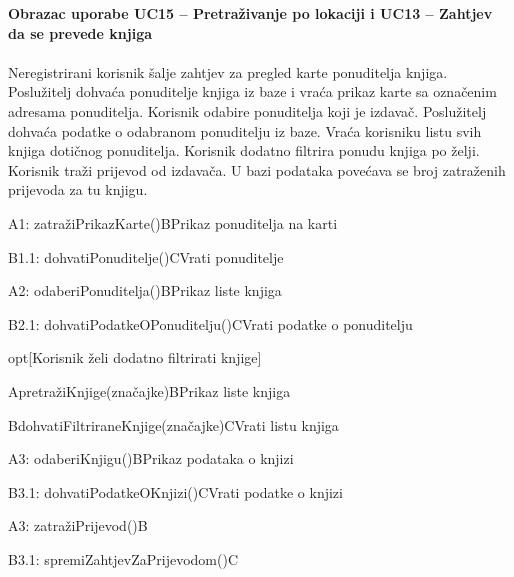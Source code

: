 				\textbf{Obrazac uporabe UC15 – Pretraživanje po lokaciji i UC13 – Zahtjev da se prevede knjiga}\\\\
				Neregistrirani korisnik šalje zahtjev za pregled karte ponuditelja knjiga. Poslužitelj dohvaća ponuditelje knjiga iz baze i vraća prikaz karte sa označenim adresama ponuditelja. Korisnik odabire ponuditelja koji je izdavač. Poslužitelj dohvaća podatke o odabranom ponuditelju iz baze. Vraća korisniku listu svih knjiga dotičnog ponuditelja. Korisnik dodatno filtrira ponudu knjiga po želji. Korisnik traži prijevod od izdavača. U bazi podataka povećava se broj zatraženih prijevoda za tu knjigu.\\
				\begin{center}
				\begin{adjustbox}{max width=\textwidth}
					\begin{sequencediagram}
						\begin{call}{A}{1: zatražiPrikazKarte()}{B}{Prikaz ponuditelja na karti}
							\begin{call}{B}{1.1: dohvatiPonuditelje()}{C}{Vrati ponuditelje}
							\end{call}
						\end{call}
						\postlevel
						\begin{call}{A}{2: odaberiPonuditelja()}{B}{Prikaz liste knjiga}
							\begin{call}{B}{2.1: dohvatiPodatkeOPonuditelju()}{C}{Vrati podatke o ponuditelju}
							\end{call}
						\end{call}
						\postlevel
						\begin{sdblock}{opt}{[Korisnik želi dodatno filtrirati knjige]}
							\begin{call}{A}{pretražiKnjige(značajke)}{B}{Prikaz liste knjiga}
								\begin{call}{B}{dohvatiFiltriraneKnjige(značajke)}{C}{Vrati listu knjiga}
								\end{call}
							\end{call}
						\end{sdblock}
						\postlevel
						\begin{call}{A}{3: odaberiKnjigu()}{B}{Prikaz podataka o knjizi}
							\begin{call}{B}{3.1: dohvatiPodatkeOKnjizi()}{C}{Vrati podatke o knjizi} 
							\end{call}
						\end{call}
						\postlevel
						\begin{messcall}{A}{3: zatražiPrijevod()}{B}
							\begin{messcall}{B}{3.1: spremiZahtjevZaPrijevodom()}{C}
							\end{messcall}
						\end{messcall}
						
					\end{sequencediagram}
				\end{adjustbox}
				\end{center}
				\eject
				
